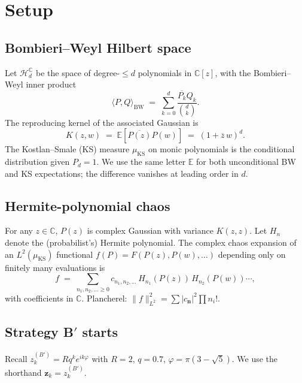 \documentclass[11pt,a4paper]{article}
\begin{document}
\tableofcontents

\section{Setup}\label{sec:setup}

\subsection{Bombieri--Weyl Hilbert space}

Let $\mathcal H_d^{\mathbb C}$ be the space of degree-$\le d$ polynomials in $\mathbb C[z]$, with the Bombieri--Weyl inner product
\begin{equation}\label{eq:BW}
\langle P, Q\rangle_{\mathrm{BW}} \;=\; \sum_{k=0}^{d} \frac{\overline{P_k} Q_k}{\binom{d}{k}}.
\end{equation}
The reproducing kernel of the associated Gaussian is
\begin{equation}\label{eq:K}
K(z, w) \;=\; \mathbb E[\overline{P(z)} P(w)] \;=\; (1 + \overline z \, w)^d.
\end{equation}
The Kostlan--Smale (KS) measure $\mu_{\mathrm{KS}}$ on monic polynomials is the conditional distribution given $P_d = 1$. We use the same letter $\mathbb E$ for both unconditional BW and KS expectations; the difference vanishes at leading order in $d$.

\subsection{Hermite-polynomial chaos}

For any $z \in \mathbb C$, $P(z)$ is complex Gaussian with variance $K(z, z)$. Let $H_n$ denote the (probabilist's) Hermite polynomial. The complex chaos expansion of an $L^2(\mu_{\mathrm{KS}})$ functional $f(P) = F(P(z), P(w), \dots)$ depending only on finitely many evaluations is
\begin{equation}\label{eq:chaos}
f \;=\; \sum_{n_1, n_2, \dots \ge 0} c_{n_1, n_2, \dots}\, H_{n_1}(P(z))\, H_{n_2}(P(w)) \cdots,
\end{equation}
with coefficients in $\mathbb C$. Plancherel: $\|f\|_{L^2}^2 = \sum |c_{\boldsymbol n}|^2 \prod n_i!$.

\subsection{Strategy B$'$ starts}

Recall $z_k^{(B')} = R q^k e^{i k \varphi}$ with $R = 2$, $q = 0.7$, $\varphi = \pi(3 - \sqrt 5)$. We use the shorthand $\mathbf z_k = z_k^{(B')}$.
\end{document}
